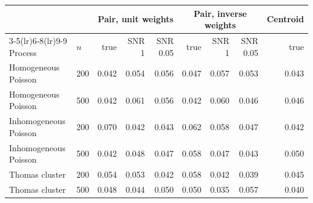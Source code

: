 \begin{tabular}{llrrrrrrr}
\toprule
 & & \multicolumn{3}{c}{Pair, unit weights} & \multicolumn{3}{c}{Pair, inverse weights} & Centroid \\
\cmidrule(lr){3-5}\cmidrule(lr){6-8}\cmidrule(lr){9-9}
Process & $n$ & true & SNR 1 & SNR 0.05 & true & SNR 1 & SNR 0.05 & true \\
\midrule
Homogeneous Poisson & 200 & 0.042 & 0.054 & 0.056 & 0.047 & 0.057 & 0.053 & 0.043 \\
Homogeneous Poisson & 500 & 0.042 & 0.061 & 0.056 & 0.042 & 0.060 & 0.046 & 0.046 \\
Inhomogeneous Poisson & 200 & 0.070 & 0.042 & 0.043 & 0.062 & 0.058 & 0.047 & 0.042 \\
Inhomogeneous Poisson & 500 & 0.042 & 0.048 & 0.047 & 0.058 & 0.047 & 0.043 & 0.050 \\
Thomas cluster & 200 & 0.054 & 0.053 & 0.042 & 0.058 & 0.042 & 0.039 & 0.045 \\
Thomas cluster & 500 & 0.048 & 0.044 & 0.050 & 0.050 & 0.035 & 0.057 & 0.040 \\
\bottomrule
\end{tabular}
